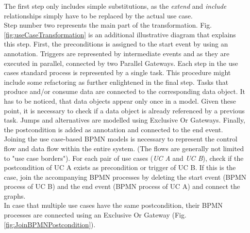 \noindent
The first step only includes simple substitutions, as the \textit{extend} and \textit{include} relationships simply have to be replaced by the actual use case.\\
Step number two represents the main part of the transformation. Fig.\ref{fig:useCaseTransformation} is an additional illustrative diagram that explains this step. First, the preconditions is assigned to the start event by using an annotation. Triggers are represented by intermediate events and as they are executed in parallel, connected by two Parallel Gateways. Each step in the use cases standard process is represented by a single task. This procedure might include some refactoring as further enlightened in the final step. Tasks that produce and/or consume data are connected to the corresponding data object. It has to be noticed, that data objects appear only once in a model. Given these point, it is necessary to check if a data object is already referenced by a previous task. Jumps and alternatives are modelled using Exclusive Or Gateways. Finally, the postcondition is added as annotation and connected to the end event. \\
Joining the use case-based BPMN models is necessary to represent the control flow and data flow within the entire system. (The flows are generally not limited to "use case borders"). For each pair of use cases (\textit{UC A} and \textit{UC B}), check if the postcondition of UC A exists as precondition or trigger of UC B. If this is the case, join the accompanying BPMN processes by deleting the start event (BPMN process of UC B) and the end event (BPMN process of UC A) and connect the graphs. \\
In case that multiple use cases have the same postcondition, their BPMN processes are connected using an Exclusive Or Gateway (Fig.\ref{fig:JoinBPMNPostcondition}). 

